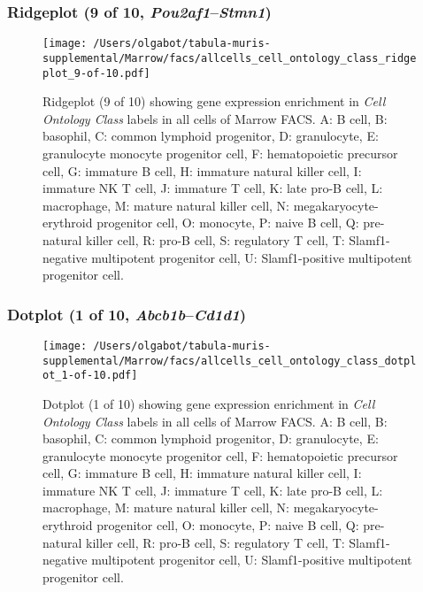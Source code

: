 \subsubsection{Ridgeplot (9 of 10, \emph{Pou2af1}--\emph{Stmn1})}
\begin{figure}[h]
\centering
\texttt{[image: /Users/olgabot/tabula-muris-supplemental/Marrow/facs/allcells\_cell\_ontology\_class\_ridgeplot\_9-of-10.pdf]}

\caption{ Ridgeplot (9 of 10)  showing gene expression enrichment in \emph{Cell Ontology Class} labels in all cells of Marrow FACS. A: B cell, B: basophil, C: common lymphoid progenitor, D: granulocyte, E: granulocyte monocyte progenitor cell, F: hematopoietic precursor cell, G: immature B cell, H: immature natural killer cell, I: immature NK T cell, J: immature T cell, K: late pro-B cell, L: macrophage, M: mature natural killer cell, N: megakaryocyte-erythroid progenitor cell, O: monocyte, P: naive B cell, Q: pre-natural killer cell, R: pro-B cell, S: regulatory T cell, T: Slamf1-negative multipotent progenitor cell, U: Slamf1-positive multipotent progenitor cell.}
\end{figure}


\clearpage

\subsubsection{Dotplot (1 of 10, \emph{Abcb1b}--\emph{Cd1d1})}
\begin{figure}[h]
\centering
\texttt{[image: /Users/olgabot/tabula-muris-supplemental/Marrow/facs/allcells\_cell\_ontology\_class\_dotplot\_1-of-10.pdf]}

\caption{ Dotplot (1 of 10)  showing gene expression enrichment in \emph{Cell Ontology Class} labels in all cells of Marrow FACS. A: B cell, B: basophil, C: common lymphoid progenitor, D: granulocyte, E: granulocyte monocyte progenitor cell, F: hematopoietic precursor cell, G: immature B cell, H: immature natural killer cell, I: immature NK T cell, J: immature T cell, K: late pro-B cell, L: macrophage, M: mature natural killer cell, N: megakaryocyte-erythroid progenitor cell, O: monocyte, P: naive B cell, Q: pre-natural killer cell, R: pro-B cell, S: regulatory T cell, T: Slamf1-negative multipotent progenitor cell, U: Slamf1-positive multipotent progenitor cell.}
\end{figure}


\clearpage

